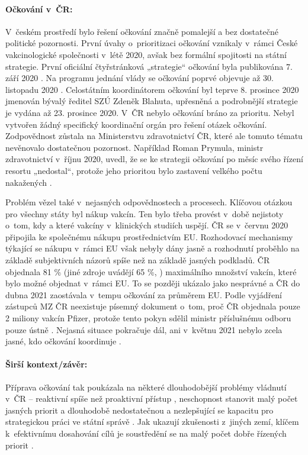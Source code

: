 \paragraph{Očkování v~ČR:} V~českém prostředí bylo řešení očkování značně pomalejší a bez dostatečné politické pozornosti. První úvahy o~prioritizaci očkování vznikaly v~rámci České vakcinologické společnosti v~létě 2020, avšak bez formální spojitosti na státní strategie. První oficiální čtyřstránková „strategie“ očkování byla publikována 7. září 2020 \cite{mz2021strat}. Na programu jednání vlády se očkování poprvé objevuje až 30. listopadu 2020 \cite{vlada_prijala_2020}. Celostátním koordinátorem očkování byl teprve 8. prosince 2020 jmenován bývalý ředitel SZÚ Zdeněk Blahuta, upřesněná a podrobnější strategie je vydána až 23. prosince 2020. V~ČR nebylo očkování bráno za prioritu. Nebyl vytvořen žádný specifický koordinační orgán pro řešení otázek očkování. Zodpovědnost zůstala na Ministerstvu zdravotnictví ČR, které ale tomuto tématu nevěnovalo dostatečnou pozornost. Například Roman Prymula, ministr zdravotnictví v~říjnu 2020, uvedl, že se ke strategii očkování po měsíc svého řízení resortu „nedostal“, protože jeho prioritou bylo zastavení velkého počtu nakažených \cite{pokorna_startuje_2020}.

Problém vězel také v~nejasných odpovědnostech a procesech. Klíčovou otázkou pro všechny státy byl nákup vakcín. Ten bylo třeba provést v~době nejistoty o~tom, kdy a které vakcíny v~klinických studiích uspějí. ČR se v~červnu 2020 připojila ke společnému nákupu prostřednictvím EU. Rozhodovací mechanismy týkající se nákupu v~rámci EU však nebyly dány jasně a rozhodnutí proběhlo na základě subjektivních názorů spíše než na základě jasných podkladů. ČR objednala 81 \% \cite{houska_cesko_2021} (jiné zdroje uvádějí 65 \%, \cite{koubsky_slozite_2021}) maximálního množství vakcín, které bylo možné objednat v~rámci EU. To se později ukázalo jako nesprávné a ČR do dubna 2021 zaostávala v~tempu očkování za průměrem EU. Podle vyjádření zástupců MZ ČR neexistuje písemný dokument o~tom, proč ČR objednala pouze 2 miliony vakcín Pfizer, protože tento pokyn sdělil ministr příslušnému odboru pouze ústně \cite{pokorna_proc_2021} . Nejasná situace pokračuje dál, ani v~květnu 2021 nebylo zcela jasné, kdo očkování koordinuje \cite{televize_nevime_2021, skoupa_je_2021}.

\paragraph{Širší kontext/závěr:} Příprava očkování tak poukázala na některé dlouhodobější problémy vládnutí v~ČR -- reaktivní spíše než proaktivní přístup \cite{hlidac_statu_nejvetsi_2020}, neschopnost stanovit malý počet jasných priorit \cite{sedlackova_stat_2020} a dlouhodobě nedostatečnou a nezlepšující se kapacitu pro strategickou práci ve státní správě \cite{ministerstvo_pro_mistni_rozvoj_cr_ministerstvo_2020}. Jak ukazují zkušenosti z~jiných zemí, klíčem k~efektivnímu dosahování cílů je soustředění se na malý počet dobře řízených priorit \cite{allas_delivering_2018, department_of_the_prime_minister_and_cabinet_our_2019, european_social_fund_public_2020}.

